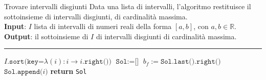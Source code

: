 \documentclass[a4paper, 12pt]{report}
\begin{document}
    \begin{framedalgo}[label={intervalli1}]{Trovare intervalli disgiunti}
        Data una lista di intervalli, l'algoritmo restituisce il sottoinsieme di intervalli disgiunti, di cardinalità massima.\\
        \textbf{Input}: $I$ lista di intervalli di numeri reali della forma $[a, b]$, con $a, b \in \mathbb{R}$.\\
        \textbf{Output}: il sottoinsieme di $I$ di intervalli disgiunti di cardinalità massima.
        \hrule
        \begin{algorithmic}[1]
                \State $I\texttt{.sort(key=}\lambda (i): i \rightarrow i\texttt{.right())}$ 
                \State $\texttt{Sol}:= \texttt{[]}$
                    \State $b_f := \texttt{Sol.last().right()}$ 
                     
                        \State $\texttt{Sol.append(}i\texttt{)}$
                    \EndIf
                \EndFor
                \State \textbf{return} \texttt{Sol}
            \EndFunction
        \end{algorithmic}
    \end{framedalgo}
\end{document}
